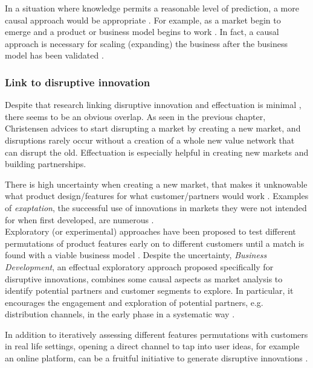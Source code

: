\documentclass[a4paper,10pt]{book}
\begin{document}
In a situation where knowledge permits a reasonable level of prediction, a more causal approach would be appropriate \cite{effectuationNewVenturePerformance}. 
For example, as a market begin to emerge and a product or business model begins to work \cite{effectuationNewVenturePerformance}. 
In fact, a causal approach is necessary for scaling (expanding) the business after the business model has been validated \cite{effectuationVideoEffectuationVsCausation}.


\subsubsection{Link to disruptive innovation}
Despite that research linking disruptive innovation and effectuation is minimal \cite{managingDisruptiveInnovation}, there seems to be an obvious overlap.
As seen in the previous chapter, Christensen advices to start disrupting a market by creating a new market, and 
disruptions rarely occur without a creation of a whole new value network that can disrupt the old. 
Effectuation is especially helpful in creating new markets and building partnerships.  

There is high uncertainty when creating a new market, that makes it unknowable what product design/features for what customer/partners 
would work \cite{effectuationDisruptiveInnovationBusinessDevelopmentMarketing}. Examples of \emph{exaptation}, the successful use of innovations 
in markets they were not intended for when first developed, are numerous  \cite{managingDisruptiveInnovation}.\\
Exploratory (or experimental) approaches have been proposed to test different permutations of product features early on to different customers until a match is found
with a viable business model \cite{managingDisruptiveInnovation}\cite{effectuationDisruptiveInnovationBusinessDevelopmentMarketing}. 
Despite the uncertainty, \emph{Business Development}, an effectual exploratory approach proposed specifically for disruptive innovations, combines 
some causal aspects as market analysis to identify potential partners and customer segments to explore. In particular, it encourages the engagement and 
exploration of potential partners, e.g. distribution channels, in the early phase in a systematic way \cite{effectuationDisruptiveInnovationBusinessDevelopmentMarketing}.

In addition to iteratively assessing different features permutations with customers in real life settings, opening a direct channel to tap into user ideas, 
for example an online platform, can be a fruitful initiative to generate disruptive innovations \cite{managingDisruptiveInnovation}.
\end{document}
